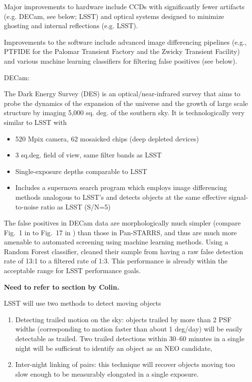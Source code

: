 \documentclass[12pt,preprint]{aastex}
\begin{document}
Major improvements to hardware include CCDs with significantly fewer 
artifacts (e.g. DECam, see below; LSST) and optical systems designed to
minimize ghosting and internal reflections (e.g. LSST). 

Improvements to the software include advanced image differencing
pipelines (e.g., PTFIDE for the Palomar Transient Factory and the
Zwicky Transient Facility) and various machine learning classifiers
for filtering false positives (see below). 

DECam: \cite{goldstein15} 

The Dark Energy Survey (DES) is an optical/near-infrared survey that
aims to probe the dynamics of the expansion of the universe and the
growth of large scale structure by imaging 5,000 sq. deg. of the
southern sky. It is technologically very similar to LSST with
\begin{itemize}
\item 520 Mpix camera, 62 mosaicked chips (deep depleted devices)
\item 3 sq.deg. field of view, same filter bands as LSST
\item Single-exposure depths comparable to LSST
\item Includes a supernova search program which employs image
differencing methods analogous to LSST’s  and detects objects at the 
same effective signal-to-noise ratio as LSST (S/N=5)
\end{itemize} 

The false positives in DECam data are morphologically much simpler
(compare Fig.~1 in \citep{goldstein15} to Fig.~17 in \citep{denneau13})
than those in Pan-STARRS, and thus are much more amenable to automated 
screening using machine learning methods. Using a Random Forest 
classifier, \cite{goldstein15} cleaned their sample from having a 
raw false detection rate of 13:1 to a filtered rate of 1:3. This performance
is already within the acceptable range for LSST performance goals. 


{\bf Need to refer to section by Colin.} 

LSST will use two methods to detect moving objects
\begin{enumerate}
\item Detecting trailed motion on the sky:  objects trailed by more
  than 2 PSF widths (corresponding to motion faster than about 1
  deg/day) will be easily detectable as trailed.  Two trailed
  detections within 30--60 minutes in a single night will be
  sufficient to identify an object as an NEO candidate,
\item Inter-night linking of pairs: this technique will recover
  objects moving too slow enough to be measurably elongated in 
  a single exposure. 
\end{enumerate} 
\end{document}
